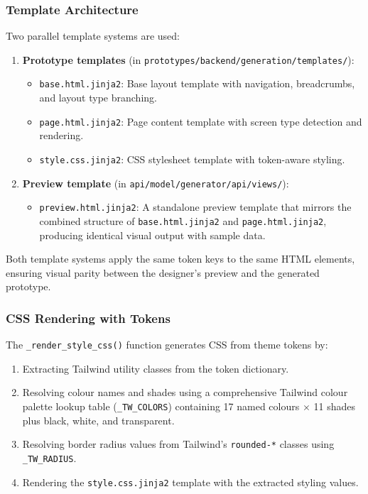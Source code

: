 \subsubsection{Template Architecture}

Two parallel template systems are used:

\begin{enumerate}
    \item \textbf{Prototype templates} (in \texttt{prototypes/backend/generation/templates/}):
    \begin{itemize}
        \item \texttt{base.html.jinja2}: Base layout template with navigation, breadcrumbs, and layout type branching.
        \item \texttt{page.html.jinja2}: Page content template with screen type detection and rendering.
        \item \texttt{style.css.jinja2}: CSS stylesheet template with token-aware styling.
    \end{itemize}
    
    \item \textbf{Preview template} (in \texttt{api/model/generator/api/views/}):
    \begin{itemize}
        \item \texttt{preview.html.jinja2}: A standalone preview template that mirrors the combined structure of \texttt{base.html.jinja2} and \texttt{page.html.jinja2}, producing identical visual output with sample data.
    \end{itemize}
\end{enumerate}

Both template systems apply the same token keys to the same HTML elements, ensuring visual parity between the designer's preview and the generated prototype.


\subsubsection{CSS Rendering with Tokens}

The \texttt{\_render\_style\_css()} function generates CSS from theme tokens by:

\begin{enumerate}
    \item Extracting Tailwind utility classes from the token dictionary.
    \item Resolving colour names and shades using a comprehensive Tailwind colour palette lookup table (\texttt{\_TW\_COLORS}) containing 17 named colours $\times$ 11 shades plus black, white, and transparent.
    \item Resolving border radius values from Tailwind's \texttt{rounded-*} classes using \texttt{\_TW\_RADIUS}.
    \item Rendering the \texttt{style.css.jinja2} template with the extracted styling values.
\end{enumerate}

